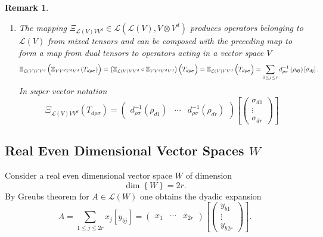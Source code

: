 \documentclass[aps,preprint]{revtex4}
\newtheorem{remark}[theorem]{Remark}
\begin{document}
\begin{remark}
\begin{enumerate}
\item The mapping $\Xi _{\mathcal{L}\left( V\right) VV^{d}}\in \mathcal{L}%
\left( \mathcal{L}\left( V\right) ,V\otimes V^{d}\right) $ produces
operators belonging to $\mathcal{L}\left( V\right) $ from mixed tensors and
can be composed with the preceding map to form a map from dual tensors to
operators acting in a vector space $V$ 
\begin{equation}
\Xi _{\mathcal{L}\left( V\right) VV^{d}}\left( \overset{}{\Xi
_{VV^{d}V^{d}V^{d}}\left( T_{d\rho \sigma }\right) }\right) =\left( \Xi _{%
\mathcal{L}\left( V\right) VV^{d}}\circ \Xi _{VV^{d}V^{d}V^{d}}\right)
\left( \overset{}{T_{d\rho \sigma }}\right) =\Xi _{\mathcal{L}\left(
V\right) VV^{d}}\left( \overset{}{T_{d\rho \sigma }}\right) =\sum_{1\leq
j\leq r}d_{\rho \sigma }^{-1}\left( \rho _{dj}\right) \left[ \sigma _{dj}%
\right] .
\end{equation}%
In super vector notation%
\begin{equation}
\Xi _{\mathcal{L}\left( V\right) VV^{d}}\left( \overset{}{T_{d\rho \sigma }}%
\right) =\left( 
\begin{array}{ccc}
d_{\rho \sigma }^{-1}\left( \rho _{d1}\right) & \cdots & d_{\rho \sigma
}^{-1}\left( \rho _{dr}\right)%
\end{array}%
\right) \left[ \left( 
\begin{array}{c}
\sigma _{d1} \\ 
\vdots \\ 
\sigma _{dr}%
\end{array}%
\right) \right]
\end{equation}
\end{enumerate}
\end{remark}

\subsection{Real Even Dimensional Vector Spaces $W$}

Consider a real even dimensional vector space $W$ of dimension 
\begin{equation}
\dim \left\{ W\right\} =2r.
\end{equation}%
By Greubs theorem for $A\in \mathcal{L}\left( W\right) $ one obtains the
dyadic expansion 
\begin{equation}
A=\sum_{1\leq j\leq 2r}x_{j}\left[ y_{bj}\right] =\left( 
\begin{array}{ccc}
x_{1} & \cdots & x_{2r}%
\end{array}%
\right) \left[ \left( 
\begin{array}{c}
y_{b1} \\ 
\vdots \\ 
y_{b2r}%
\end{array}%
\right) \right] .
\end{equation}
\end{document}
